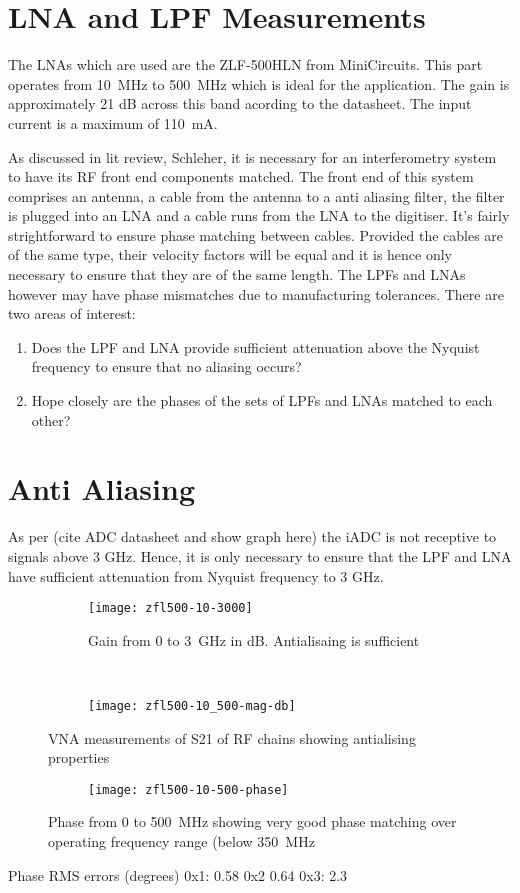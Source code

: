 \section{LNA and LPF Measurements}

The LNAs which are used are the ZLF-500HLN from MiniCircuits. This part operates from \SI{10}{\mega\hertz} to \SI{500}{\mega\hertz} which is ideal for the application. The gain is approximately 21 dB across this band acording to the datasheet. The input current is a maximum of \SI{110}{\milli\ampere}.

As discussed in lit review, Schleher, it is necessary for an interferometry system to have its RF front end components matched. The front end of this system comprises an antenna, a cable from the antenna to a anti aliasing filter, the filter is plugged into an LNA and a cable runs from the LNA to the digitiser. 
It's fairly strightforward to ensure phase matching between cables. Provided the cables are of the same type, their velocity factors will be equal and it is hence only necessary to ensure that they are of the same length.
The LPFs and LNAs however may have phase mismatches due to manufacturing tolerances. 
There are two areas of interest:
\begin{enumerate}
  \item Does the LPF and LNA provide sufficient attenuation above the Nyquist frequency to ensure that no aliasing occurs?
  \item Hope closely are the phases of the sets of LPFs and LNAs matched to each other?
\end{enumerate}

\section{Anti Aliasing}
As per (cite ADC datasheet and show graph here) the iADC is not receptive to signals above 3 GHz. Hence, it is only necessary to ensure that the LPF and LNA have sufficient attenuation from Nyquist frequency to 3 GHz. 

\begin{figure}
  \centering
  \begin{subfigure}{\textwidth}
    \centering
    \texttt{[image: zfl500-10-3000]}
    \caption{Gain from 0 to \SI{3}{\giga\hertz} in dB. Antialisaing is sufficient}
  \end{subfigure}\\[1em]
  \begin{subfigure}{\textwidth}
    \centering
    \texttt{[image: zfl500-10\_500-mag-db]}
  \end{subfigure}
  \caption{VNA measurements of S21 of RF chains showing antialising properties}
  \begin{subfigure}{\textwidth}
    \centering
    \texttt{[image: zfl500-10-500-phase]}
  \end{subfigure}
  \caption{Phase from 0 to \SI{500}{\mega\hertz} showing very good phase matching over operating frequency range (below \SI{350}{\mega\hertz}}
\end{figure}

Phase RMS errors (degrees)
0x1: 0.58
0x2 0.64
0x3: 2.3
